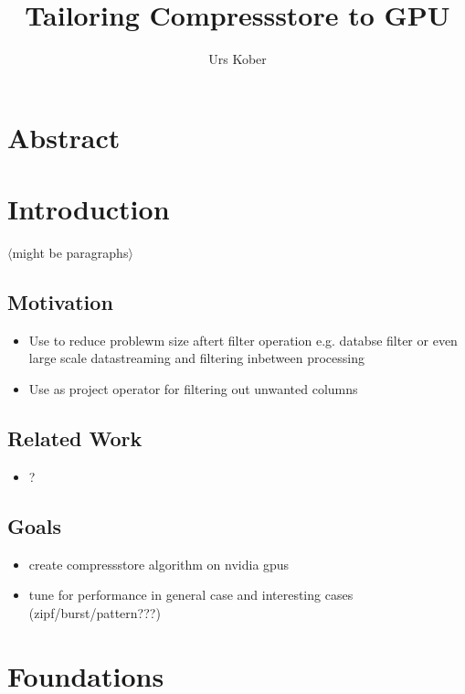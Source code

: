 \documentclass{tudscrartcl}
\title{Tailoring Compressstore to GPU}
\author{Urs Kober}
\newcommand{\markr}[1]{\textcolor{review}{$\langle$#1$\rangle$}}
\begin{document}
	
	
	\section*{Abstract}
	
	\section{Introduction}
	
		\markr{might be paragraphs}
		
		\subsection{Motivation}
		
			\begin{itemize}
				\item Use to reduce problewm size aftert filter operation
					\subitem e.g. databse filter
					\subitem or even large scale datastreaming and filtering inbetween processing
				\item Use as project operator for filtering out unwanted columns
			\end{itemize}
		
		\subsection{Related Work}
		
			\begin{itemize}
				\item ?
			\end{itemize}
		
		\subsection{Goals}
		
			\begin{itemize}
				\item create compressstore algorithm on nvidia gpus
				\item tune for performance in general case and interesting cases (zipf/burst/pattern???)
			\end{itemize}
		
	\section{Foundations}
	
\end{document}

